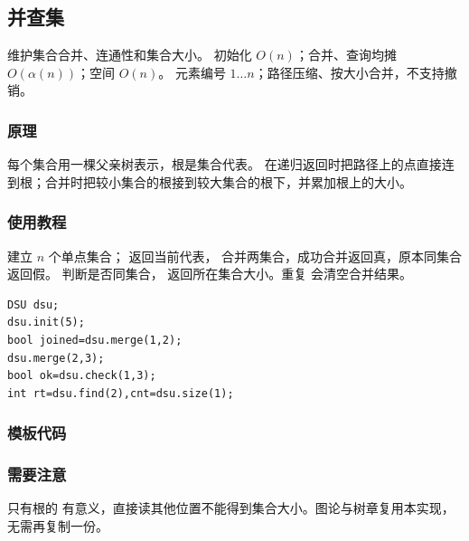 \subsection{并查集}
\label{ds:dsu}
\AlgorithmInfo
    {维护集合合并、连通性和集合大小。}
    {初始化 $O(n)$；合并、查询均摊 $O(\alpha(n))$；空间 $O(n)$。}
    {元素编号 $1\ldots n$；路径压缩、按大小合并，不支持撤销。}
\subsubsection*{原理}
每个集合用一棵父亲树表示，根是集合代表。 在递归返回时把路径上的点直接连到根；合并时把较小集合的根接到较大集合的根下，并累加根上的大小。

\subsubsection*{使用教程}
 建立 $n$ 个单点集合； 返回当前代表， 合并两集合，成功合并返回真，原本同集合返回假。 判断是否同集合， 返回所在集合大小。重复  会清空合并结果。
\begin{lstlisting}[style=mtycpp,numbers=none]
DSU dsu;
dsu.init(5);
bool joined=dsu.merge(1,2);
dsu.merge(2,3);
bool ok=dsu.check(1,3);
int rt=dsu.find(2),cnt=dsu.size(1);
\end{lstlisting}
\subsubsection*{模板代码}
\subsubsection*{需要注意}
只有根的  有意义，直接读其他位置不能得到集合大小。图论与树章复用本实现，无需再复制一份。

